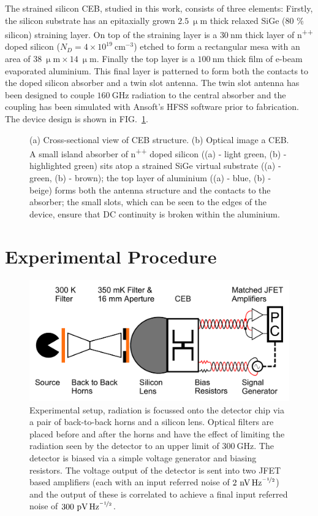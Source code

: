 \documentclass[aip, apl, a4paper, amsmath,amssymb, reprint]{revtex4-1}
\begin{document}
The strained silicon CEB, studied in this work, consists of three elements: Firstly, the silicon substrate has an epitaxially grown $2.5~\mathrm{\upmu m}$ thick relaxed SiGe (80 \% silicon) straining layer.  On top of the straining layer is a $30~\mathrm{nm}$ thick layer of n\textsuperscript{++} doped silicon ($N_{D} = 4 \times 10^{19}~\mathrm{cm}^{-3}$) etched to form a rectangular mesa with an area of $38~\mathrm{\upmu m} \times 14~\mathrm{\upmu m}$. Finally the top layer is a $100~\mathrm{nm}$ thick film of e-beam evaporated aluminium. This final layer is patterned to form both the contacts to the doped silicon absorber and a twin slot antenna. The twin slot antenna has been designed to couple $160~\mathrm{GHz}$ radiation to the central absorber and the coupling has been simulated with Ansoft's HFSS software prior to fabrication. The device design is shown in FIG.~\ref{fig:device_design}.
\begin{figure}[ht]
\caption{(a) Cross-sectional view of CEB structure. (b) Optical image a CEB. A small island absorber of n\textsuperscript{++} doped silicon ((a) - light green, (b) - highlighted green) sits atop a strained SiGe virtual substrate ((a) - green, (b) - brown); the top layer of aluminium ((a) - blue, (b) - beige) forms both the antenna structure and the contacts to the absorber; the small slots, which can be seen to the edges of the device, ensure that DC continuity is broken within the aluminium.}\label{fig:device_design}
\end{figure}

\section{Experimental Procedure}\label{sec:exp_procedure}
\begin{figure}[ht]
\includegraphics[width = 0.8\columnwidth]{experimental_setup}
\caption{Experimental setup, radiation is focussed onto the detector chip via a pair of back-to-back horns and a silicon lens. Optical filters are placed before and after the horns and have the effect of limiting the radiation seen by the detector to an upper limit of $300~\mathrm{GHz}$. The detector is biased via a simple voltage generator and biasing resistors. The voltage output of the detector is sent into two JFET based amplifiers (each with an input referred noise of $2~\mathrm{\mbox{nV\,Hz}^{\nicefrac{-1}{2}}}$) and the output of these is correlated to achieve a final input referred noise of $300~\mathrm{\mbox{pV\,Hz}^{\nicefrac{-1}{2}}}$.}
\label{fig:exp_setup}
\end{figure}
\end{document}
